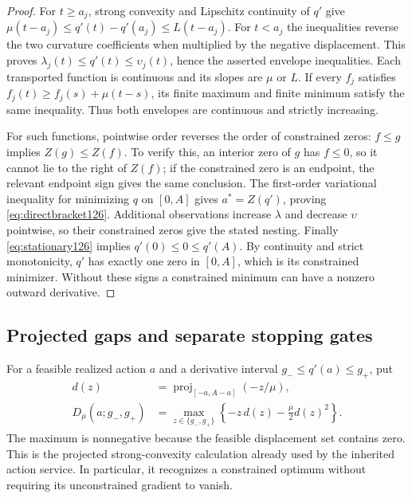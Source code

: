 \begin{proof}
For $t\ge a_j$, strong convexity and Lipschitz continuity of $q'$
give
$\mu(t-a_j)\le q'(t)-q'(a_j)\le L(t-a_j)$.
For $t<a_j$ the inequalities reverse the two curvature coefficients
when multiplied by the negative displacement.  This proves
$\lambda_j(t)\le q'(t)\le\upsilon_j(t)$, hence the asserted envelope
inequalities.  Each transported function is continuous and its slopes
are $\mu$ or $L$.  If every $f_j$ satisfies
$f_j(t)\ge f_j(s)+\mu(t-s)$, its finite maximum and finite minimum
satisfy the same inequality.  Thus both envelopes are continuous and
strictly increasing.

For such functions, pointwise order reverses the order of constrained
zeros: $f\le g$ implies $Z(g)\le Z(f)$.  To verify this, an interior
zero of $g$ has $f\le0$, so it cannot lie to the right of $Z(f)$;
if the constrained zero is an endpoint, the relevant endpoint sign
gives the same conclusion.  The first-order variational inequality
for minimizing $q$ on $[0,A]$ gives $a^*=Z(q')$, proving
\eqref{eq:directbracket126}.  Additional observations increase
$\lambda$ and decrease $\upsilon$ pointwise, so their constrained
zeros give the stated nesting.  Finally \eqref{eq:stationary126}
implies $q'(0)\le0\le q'(A)$.  By continuity and strict monotonicity,
$q'$ has exactly one zero in $[0,A]$, which is its constrained
minimizer.  Without these signs a constrained minimum can have a
nonzero outward derivative.
\end{proof}

\subsection{Projected gaps and separate stopping gates}

For a feasible realized action $a$ and a derivative interval
$g_-\le q'(a)\le g_+$, put
\begin{align}
 d(z)&=\operatorname{proj}_{[-a,A-a]}(-z/\mu),\nonumber\\
 D_\mu(a;g_-,g_+)&=
 \max_{z\in\{g_-,g_+\}}
       \left\{-z\,d(z)-\frac\mu2d(z)^2\right\}.
 \label{eq:projectedgap126}
\end{align}
The maximum is nonnegative because the feasible displacement set
contains zero.  This is the projected strong-convexity calculation
already used by the inherited action service.  In particular, it
recognizes a constrained optimum without requiring its unconstrained
gradient to vanish.

